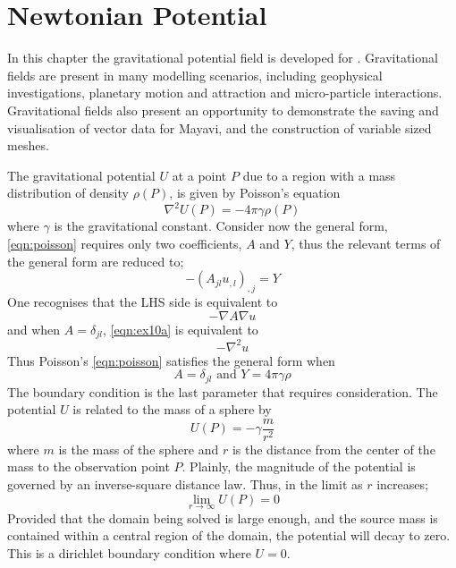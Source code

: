 
%
%
%

\section{Newtonian Potential}

In this chapter the gravitational potential field is developed for \esc.
Gravitational fields are present in many modelling scenarios, including
geophysical investigations, planetary motion and attraction and micro-particle
interactions. Gravitational fields also present an opportunity to demonstrate
the saving and visualisation of vector data for Mayavi, and the construction of
variable sized meshes.

The gravitational potential $U$ at a point $P$ due to a region with a mass
distribution of density $\rho(P)$, is given by Poisson's equation
\citep{Blakely1995}
\begin{equation} \label{eqn:poisson}
\nabla^2 U(P) = -4\pi\gamma\rho(P)
\end{equation}
where $\gamma$ is the gravitational constant.
Consider now the \esc general form, 
\autoref{eqn:poisson} requires only two coefficients,
$A$ and $Y$, thus the relevant terms of the general form are reduced to;
\begin{equation}
-\left(A_{jl} u_{,l} \right)_{,j} = Y
\end{equation}
One recognises that the LHS side is equivalent to 
\begin{equation} \label{eqn:ex10a}
-\nabla A \nabla u
\end{equation}
and when $A=\delta_{jl}$, \autoref{eqn:ex10a} is equivalent to
\begin{equation*}
-\nabla^2 u
\end{equation*}
Thus Poisson's \autoref{eqn:poisson} satisfies the general form when
\begin{equation}
A=\delta_{jl} \text{ and } Y= 4\pi\gamma\rho
\end{equation}
The boundary condition is the last parameter that requires consideration. The
potential $U$ is related to the mass of a sphere by
\begin{equation}
U(P)=-\gamma \frac{m}{r^2}
\end{equation} where $m$ is the mass of the sphere and $r$ is the distance from
the center of the mass to the observation point $P$. Plainly, the magnitude
of the potential is governed by an inverse-square distance law. Thus, in the
limit as $r$ increases;
\begin{equation}
\lim_{r\to\infty} U(P) = 0
\end{equation}
Provided that the domain being solved is large enough, and the source mass is
contained within a central region of the domain, the potential will decay to
zero. This is a dirichlet boundary condition where $U=0$.

